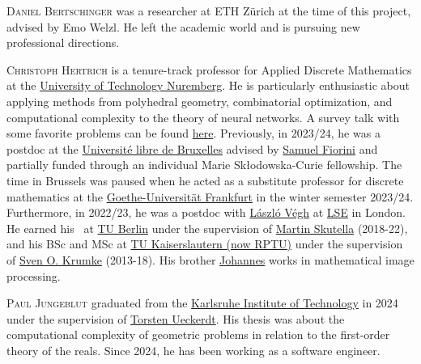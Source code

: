 \documentclass{toc}
\begin{document}
\begin{tocaboutauthors}
\begin{tocabout}[bertschinger]  %
  \textsc{Daniel Bertschinger} was a researcher at ETH Z{\"u}rich at the time of this project, 
advised by Emo Welzl. He left the academic world and is pursuing new professional directions.
\end{tocabout}
\begin{tocabout}[hertrich]  %
  \textsc{Christoph Hertrich} is a tenure-track professor for Applied Discrete Mathematics at
the %
\href{https://www.utn.de/}{University of Technology Nuremberg}. He is particularly enthusiastic about applying methods from polyhedral geometry, combinatorial optimization, and computational complexity to the theory of neural networks. A survey talk with some favorite problems can be found 
\href{https://www.youtube.com/watch?v=solcZvvt3Cw}{here}.
Previously, in 2023/24, he was a postdoc at
the  %
\href{https://www.ulb.be/}{Université libre de Bruxelles} advised by 
\href{https://samuel.fiorini.web.ulb.be/}{Samuel Fiorini} and partially funded through 
an individual Marie Sk{\l}odowska-Curie fellowship. The time in Brussels was paused when 
he acted as a substitute professor for discrete mathematics at
the  %
\href{https://www.uni-frankfurt.de/en}{Goethe-Universit{\"a}t Frankfurt} in the winter 
semester 2023/24. Furthermore, in 2022/23, he was a postdoc with 
\href{https://www.laszlovegh.eu/}{László Végh} at 
\href{https://www.lse.ac.uk/}{LSE} in London. He earned his \phd\ at 
\href{https://www.tu.berlin/}{TU Berlin} under the supervision of 
\href{https://www3.math.tu-berlin.de/coga/team/skutella/}{Martin Skutella} (2018-22), 
and his BSc and MSc at \href{https://rptu.de/}{TU Kaiserslautern (now RPTU)} under the 
supervision of \href{https://math.rptu.de/ags/opt/personen/leitung/krumke}{Sven O. Krumke}
 (2013-18). His brother \href{https://johertrich.github.io/}{Johannes} works in mathematical 
image processing.
\end{tocabout}
\begin{tocabout}[jungeblut]  %
  \textsc{Paul Jungeblut} graduated from
the  %
\href{https://kit.edu}{Karlsruhe Institute of Technology}
in 2024 %
under the supervision of 
\href{https://i11www.iti.kit.edu/en/members/torsten_ueckerdt/index}{Torsten Ueckerdt}.
His thesis was about the computational complexity of geometric problems in relation 
to the first-order theory of the reals.
Since 2024, he %
has been working  %
as a software engineer.
\end{tocabout}
\begin{tocabout}[miltzow]  %

\end{tocabout}
\end{tocaboutauthors}
\end{document}
